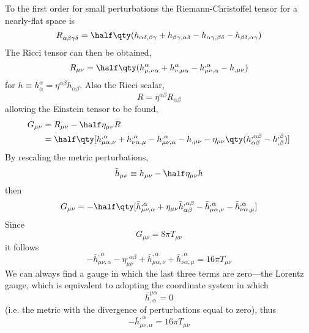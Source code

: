 To the first order for small perturbations the Riemann-Christoffel
tensor for a nearly-flat space is 
\begin{equation}
  \label{eq:7}
  \tensor{R}{_{\alpha \beta \gamma \delta}} = \half \qty( h_{\alpha \delta, \beta \gamma}+ h_{\beta \gamma, \alpha \delta} - h_{\alpha \gamma, \beta \delta} - h_{\beta \delta,\alpha \gamma} )
\end{equation}
The Ricci tensor can then be obtained,
\begin{equation}
  \label{eq:8}
  R_{\mu \nu} = \half \qty( h^{\alpha}_{\mu, \nu \alpha} + h^{\alpha}_{\nu, \mu \alpha} - h_{\mu \nu,\alpha}^{,\alpha} - h_{, \mu \nu} )
\end{equation} for $h \equiv h^{\alpha}_{\alpha} = \eta^{\alpha \beta} h_{\alpha \beta}$. Also the Ricci scalar,
\begin{equation}
  \label{eq:9}
  R = \eta^{\alpha \beta} R_{\alpha \beta}
\end{equation}
allowing the Einstein tensor to be found,
\begin{align}
  G_{\mu \nu} &= R_{\mu \nu} - \half \eta_{\mu \nu} R \nonumber\\
&= \half \qty[h_{\mu \alpha,\nu}^{,\alpha} + h_{\nu \alpha,\mu}^{, \alpha} - h_{\mu \nu,\alpha}^{,\alpha} - h_{, \mu \nu} - \eta_{\mu \nu} \qty( h_{\alpha \beta}^{,\alpha \beta} - h_{,\beta}^{,\beta})]
\end{align}
By rescaling the metric perturbations,
\begin{equation}
  \label{eq:10}
  \bar{h}_{\mu \nu} \equiv h_{\mu \nu} - \half \eta_{\mu \nu} h
\end{equation}
then 
\begin{equation}
  \label{eq:11}
  G_{\mu \nu} = - \half \qty[ \bar{h}_{\mu \nu, \alpha}^{,\alpha} + \eta_{\mu \nu}\bar{h}_{\alpha \beta}^{, \alpha \beta} - \bar{h}_{\mu \alpha, \nu}^{,\alpha} - \bar{h}_{\nu \alpha, \mu}^{, \alpha}]
\end{equation}
Since
\[ G_{\mu \nu} = 8 \pi T_{\mu \nu} \] it follows
\begin{equation}
  \label{eq:12}
  - \bar{h}_{\mu \nu,\alpha}^{,\alpha} - \eta_{\mu \nu}^{,\alpha \beta} + \bar{h}_{\mu \alpha, \nu}^{, \alpha} + \bar{h}_{\nu \alpha, \mu}^{,\alpha} = 16 \pi T_{\mu \nu}
\end{equation}
We can always find a gauge in which the last three terms are
zero---the Lorentz gauge, which is equivalent to adopting the
coordinate system in which \[ \bar{h}^{\mu \alpha}_{, \alpha} = 0 \]
(i.e. the metric with the divergence of perturbations equal to zero), thus
\begin{equation}
  \label{eq:13}
  - \bar{h}_{\mu \nu, \alpha}^{,\alpha} = 16 \pi T_{\mu \nu}
\end{equation}

